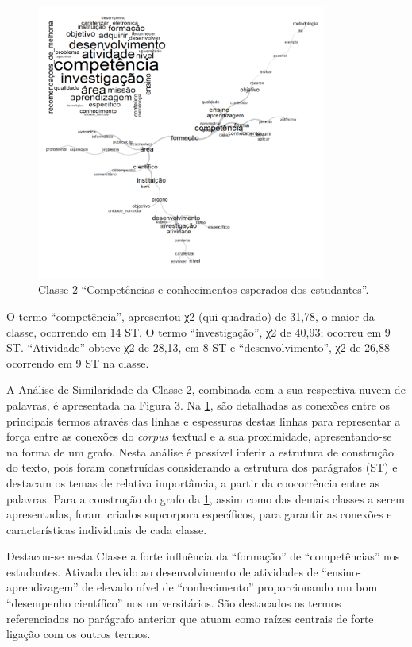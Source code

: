 \documentclass{textolivre-html}
\begin{document}
\begin{figure}[htbp]
 \centering
 \includegraphics[width=0.85\textwidth]{Fig03.png}
 \caption{Classe 2 “Competências e conhecimentos esperados dos estudantes”.}
 \label{Fig03}
\end{figure}

O termo “competência”, apresentou χ2 (qui-quadrado) de 31,78, o maior da classe, ocorrendo em 14 ST. O termo “investigação”, χ2 de 40,93; ocorreu em 9 ST. “Atividade” obteve χ2 de 28,13, em 8 ST e “desenvolvimento”, χ2 de 26,88 ocorrendo em 9 ST na classe.

A Análise de Similaridade da Classe 2, combinada com a sua respectiva nuvem de palavras, é apresentada na Figura 3. 
Na \cref{Fig03}, são detalhadas as conexões entre os principais termos através das linhas e espessuras destas linhas para representar a força entre as conexões do \textit{corpus} textual e a sua proximidade, apresentando-se na forma de um grafo. Nesta análise é possível inferir a estrutura de construção do texto, pois foram construídas considerando a estrutura dos parágrafos (ST) e destacam os temas de relativa importância, a partir da coocorrência entre as palavras. Para a construção do grafo da \cref{Fig03}, assim como das demais classes a serem apresentadas, foram criados supcorpora específicos, para garantir as conexões e características individuais de cada classe.

Destacou-se nesta Classe a forte influência da “formação” de “competências” nos estudantes. Ativada devido ao desenvolvimento de atividades de “ensino-aprendizagem” de elevado nível de “conhecimento” proporcionando um bom “desempenho científico” nos universitários. São destacados os termos referenciados no parágrafo anterior que atuam como raízes centrais de forte ligação com os outros termos.
\end{document}
